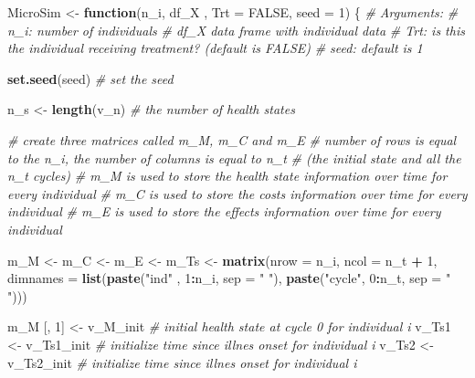 \documentclass[
]{article}
\newenvironment{Shaded}{\begin{snugshade}}{\end{snugshade}}
\newcommand{\CommentTok}[1]{\textcolor[rgb]{0.56,0.35,0.01}{\textit{#1}}}
\newcommand{\ControlFlowTok}[1]{\textcolor[rgb]{0.13,0.29,0.53}{\textbf{#1}}}
\newcommand{\DataTypeTok}[1]{\textcolor[rgb]{0.13,0.29,0.53}{#1}}
\newcommand{\DecValTok}[1]{\textcolor[rgb]{0.00,0.00,0.81}{#1}}
\newcommand{\KeywordTok}[1]{\textcolor[rgb]{0.13,0.29,0.53}{\textbf{#1}}}
\newcommand{\NormalTok}[1]{#1}
\newcommand{\OperatorTok}[1]{\textcolor[rgb]{0.81,0.36,0.00}{\textbf{#1}}}
\newcommand{\OtherTok}[1]{\textcolor[rgb]{0.56,0.35,0.01}{#1}}
\newcommand{\StringTok}[1]{\textcolor[rgb]{0.31,0.60,0.02}{#1}}
\begin{document}
\begin{Shaded}
\begin{Highlighting}[]
\NormalTok{MicroSim <-}\StringTok{ }\ControlFlowTok{function}\NormalTok{(n_i, df_X , }\DataTypeTok{Trt =} \OtherTok{FALSE}\NormalTok{, }\DataTypeTok{seed =} \DecValTok{1}\NormalTok{) \{}
  \CommentTok{# Arguments:  }
    \CommentTok{# n_i:     number of individuals}
    \CommentTok{# df_X     data frame with individual data }
    \CommentTok{# Trt:     is this the individual receiving treatment? (default is FALSE)}
    \CommentTok{# seed:    default is 1}
  
  \KeywordTok{set.seed}\NormalTok{(seed)     }\CommentTok{# set the seed}
  
\NormalTok{  n_s <-}\StringTok{ }\KeywordTok{length}\NormalTok{(v_n) }\CommentTok{# the number of health states}
  
  \CommentTok{# create three matrices called m_M, m_C and m_E}
  \CommentTok{# number of rows is equal to the n_i, the number of columns is equal to n_t  }
  \CommentTok{# (the initial state and all the n_t cycles)}
  \CommentTok{# m_M is used to store the health state information over time for every individual}
  \CommentTok{# m_C is used to store the costs information over time for every individual}
  \CommentTok{# m_E is used to store the effects information over time for every individual}
  
\NormalTok{  m_M <-}\StringTok{ }\NormalTok{m_C <-}\StringTok{ }\NormalTok{m_E <-}\StringTok{ }\NormalTok{m_Ts <-}\StringTok{  }\KeywordTok{matrix}\NormalTok{(}\DataTypeTok{nrow =}\NormalTok{ n_i, }\DataTypeTok{ncol =}\NormalTok{ n_t }\OperatorTok{+}\StringTok{ }\DecValTok{1}\NormalTok{, }
                                       \DataTypeTok{dimnames =} \KeywordTok{list}\NormalTok{(}\KeywordTok{paste}\NormalTok{(}\StringTok{"ind"}\NormalTok{  , }\DecValTok{1}\OperatorTok{:}\NormalTok{n_i, }\DataTypeTok{sep =} \StringTok{" "}\NormalTok{), }
                                                       \KeywordTok{paste}\NormalTok{(}\StringTok{"cycle"}\NormalTok{, }\DecValTok{0}\OperatorTok{:}\NormalTok{n_t, }\DataTypeTok{sep =} \StringTok{" "}\NormalTok{)))  }
  
\NormalTok{  m_M [, }\DecValTok{1}\NormalTok{] <-}\StringTok{ }\NormalTok{v_M_init      }\CommentTok{# initial health state at cycle 0 for individual i}
\NormalTok{  v_Ts1      <-}\StringTok{ }\NormalTok{v_Ts1_init   }\CommentTok{# initialize time since illnes onset for individual i}
\NormalTok{  v_Ts2      <-}\StringTok{ }\NormalTok{v_Ts2_init   }\CommentTok{# initialize time since illnes onset for individual i}
  

\end{Highlighting}
\end{Shaded}
\end{document}
